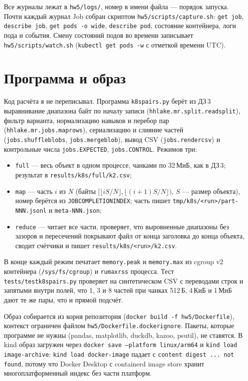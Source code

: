 \documentclass[11pt,a4paper]{article}
\DeclareRobustCommand{\code}[1]{\begingroup\renewcommand{\_}{\textunderscore\allowbreak}\renewcommand{\slash}{/\allowbreak}\texttt{#1}\endgroup}
\begin{document}
Все журналы лежат в \code{hw5/logs/}, номер в имени файла --- порядок запуска. Почти каждый журнал Job собран скриптом \code{hw5/scripts/capture.sh}: \code{get job}, \code{describe job}, \code{get pods -o wide}, \code{describe pod}, состояние контейнера, логи пода и события. Смену состояний подов во времени записывает \code{hw5/scripts/watch.sh} (\code{kubectl get pods -w} с отметкой времени UTC).

\section{Программа и образ}

Код расчёта я не переписывал. Программа \code{k8spairs.py} берёт из ДЗ\,3 выравнивание диапазона байт по началу записи (\code{hhlake.mr.split.read\_split}), фильтр варианта, нормализацию навыков и перебор пар (\code{hhlake.mr.jobs.map\_rows}), сериализацию и слияние частей (\code{jobs.shuffle\_blobs}, \code{jobs.merge\_blob}), вывод CSV (\code{jobs.render\_csv}) и контрольные числа \code{jobs.EXPECTED}, \code{jobs.CONTROL}. Режимов три:
\begin{itemize}
  \item \code{full} --- весь объект в одном процессе, чанками по 32\,МиБ, как в ДЗ\,3; результат в \code{results/k8s/full/k2.csv};
  \item \code{map} --- часть $i$ из $N$ (байты $[\lfloor iS/N\rfloor, \lfloor (i+1)S/N\rfloor)$, $S$ --- размер объекта), номер берётся из \code{JOB\_COMPLETION\_INDEX}; часть пишет \code{tmp/k8s/<run>/part-NNN.jsonl} и \code{meta-NNN.json};
  \item \code{reduce} --- читает все части, проверяет, что выровненные диапазоны без зазоров и пересечений покрывают файл от конца заголовка до конца объекта, сводит счётчики и пишет \code{results/k8s/<run>/k2.csv}.
\end{itemize}
В конце каждый режим печатает \code{memory.peak} и \code{memory.max} из cgroup v2 контейнера (\code{\slash sys\slash fs\slash cgroup}) и \code{ru\_maxrss} процесса. Тест \code{tests\slash test\_k8spairs.py} проверяет на синтетическом CSV с переводами строк и запятыми внутри полей, что 1, 3 и 8 частей при чанках 512\,Б, 4\,КиБ и 1\,МиБ дают те же пары, что и прямой подсчёт.

Образ собирается из корня репозитория (\code{docker build -f hw5/Dockerfile}), контекст ограничен файлом \code{hw5/Dockerfile.dockerignore}. Пакеты, которые программе не нужны (pandas, matplotlib, duckdb, kazoo, psutil), не ставятся. В kind образ загружен через \code{docker save --platform linux/arm64} и \code{kind load image-archive}: \code{kind load docker-image} падает с \code{content digest ... not found}, потому что Docker Desktop с containerd image store хранит многоплатформенный индекс без части платформ.
\end{document}
